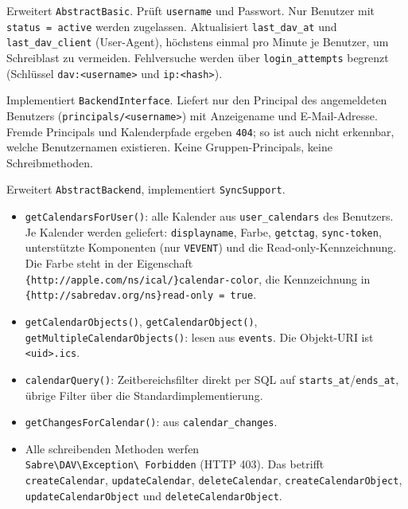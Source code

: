 \documentclass[a4paper,fontsize=10pt]{scrartcl}
\newcommand{\code}[1]{\texttt{#1}}
\begin{document}
\begin{description}[style=nextline, leftmargin=1.2cm]
  \item[\code{FfAuthBackend}]
    Erweitert \code{AbstractBasic}.
    Prüft \code{username} und Passwort. Nur Benutzer mit
    \code{status = active} werden zugelassen. Aktualisiert
    \code{last\_dav\_at} und \code{last\_dav\_client} (User-Agent),
    höchstens einmal pro Minute je Benutzer, um Schreiblast zu vermeiden.
    Fehlversuche werden über \code{login\_attempts} begrenzt
    (Schlüssel \code{dav:<username>} und \code{ip:<hash>}).
  \item[\code{FfPrincipalBackend}]
    Implementiert \code{BackendInterface}.
    Liefert nur den Principal des angemeldeten Benutzers
    (\code{principals/<username>}) mit Anzeigename und E-Mail-Adresse.
    Fremde Principals und Kalenderpfade ergeben \code{404}; so ist auch
    nicht erkennbar, welche Benutzernamen existieren. Keine
    Gruppen-Principals, keine Schreibmethoden.
  \item[\code{FfCalendarBackend}]
    Erweitert \code{AbstractBackend}, implementiert \code{SyncSupport}.
    \begin{itemize}
      \item \code{getCalendarsForUser()}: alle Kalender aus
            \code{user\_calendars} des Benutzers. Je Kalender werden
            geliefert: \code{displayname}, Farbe, \code{getctag},
            \code{sync-token}, unterstützte Komponenten (nur
            \code{VEVENT}) und die Read-only-Kennzeichnung. Die Farbe
            steht in der Eigenschaft\\
            \code{\{http://apple.com/ns/ical/\}calendar-color}, die
            Kennzeichnung in\\
            \code{\{http://sabredav.org/ns\}read-only = true}.
      \item \code{getCalendarObjects()}, \code{getCalendarObject()},
            \code{getMultipleCalendarObjects()}: lesen aus \code{events}.
            Die Objekt-URI ist \code{<uid>.ics}.
      \item \code{calendarQuery()}: Zeitbereichsfilter direkt per SQL auf
            \code{starts\_at}/\code{ends\_at}, übrige Filter über die
            Standardimplementierung.
      \item \code{getChangesForCalendar()}: aus \code{calendar\_changes}.
      \item Alle schreibenden Methoden werfen\\
            \code{Sabre\textbackslash DAV\textbackslash Exception\textbackslash
            Forbidden} (HTTP 403). Das betrifft
            \code{createCalendar}, \code{updateCalendar},
            \code{deleteCalendar}, \code{createCalendarObject},
            \code{updateCalendarObject} und \code{deleteCalendarObject}.
    \end{itemize}
\end{description}
\end{document}
